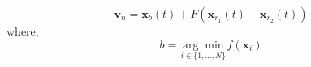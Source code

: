 $$\mathbf{v}_{n}=\mathbf{x}_{b}(t)+F\left(\mathbf{x}_{r_{1}}(t)-\mathbf{x}_{r_{2}}(t)\right)$$
where,
$$
b=\underset{i \in\{1, \ldots, N\}}{\arg \min } f\left(\mathbf{x}_{i}\right)
$$